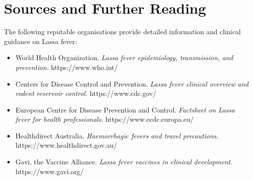 \section*{Sources and Further Reading}
The following reputable organisations provide detailed information and clinical guidance on Lassa fever:
\begin{itemize}
    \item World Health Organization. \textit{Lassa fever epidemiology, transmission, and prevention.} https://www.who.int/
    \item Centers for Disease Control and Prevention. \textit{Lassa fever clinical overview and rodent reservoir control.} https://www.cdc.gov/
    \item European Centre for Disease Prevention and Control. \textit{Factsheet on Lassa fever for health professionals.} https://www.ecdc.europa.eu/
    \item Healthdirect Australia. \textit{Haemorrhagic fevers and travel precautions.} https://www.healthdirect.gov.au/
    \item Gavi, the Vaccine Alliance. \textit{Lassa fever vaccines in clinical development.} https://www.gavi.org/
\end{itemize}

\clearpage
